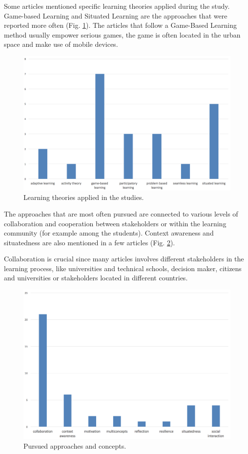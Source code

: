 Some articles mentioned specific learning theories applied during the study. Game-based Learning and Situated Learning\cite{anderson_situated_1996} are the approaches that were reported more often (Fig. \ref{fig:learn_theories}).
The articles that follow a Game-Based Learning method usually empower serious games\cite{poplin_digital_2014-2}, the game is often located in the urban space and make use of mobile devices\cite{huizenga_cognitive_2008}.

\begin{figure}[htb]
\centering
\includegraphics[width=12cm]{img/learning_theories}
\caption{Learning theories applied in the studies.}
\label{fig:learn_theories}
\end{figure}

The approaches that are most often pursued are connected to various levels of collaboration and cooperation between stakeholders or within the learning community (for example among the students). Context awareness and situatedness are also mentioned in a few articles (Fig. \ref{fig:approaches}).

Collaboration is crucial since many articles involves different stakeholders in the learning process, like universities and technical schools\cite{lee_platform_2011}, decision maker, citizens and universities\cite{evans_give_2014} or stakeholders located in different countries\cite{ross_facilitating_2009}\cite{severengiz_enhancing_2015}.

\begin{figure}[htb]
\centering
\includegraphics[width=12cm]{img/approaches}
\caption{Pursued approaches and concepts.}
\label{fig:approaches}
\end{figure}


